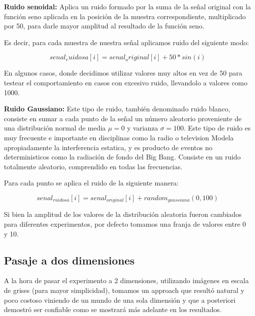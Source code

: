 \begin{itemize}
	\begin{item} {\bf Ruido senoidal:} Aplica un ruido formado por la suma de la se\~nal
original con la funci\'on seno aplicada en la posici\'on de la muestra
correspondiente, multiplicado por 50, para darle mayor amplitud al resultado de
la funci\'on seno.

	Es decir, para cada muestra de nuestra se\~nal aplicamos ruido del siguiente
modo:

	$$senal_ruidosa[i] = senal_original[i] + 50 * sin(i)$$

  En algunos casos, donde decidimos utilizar valores muy altos en vez de 50
para testear el comportamiento en casos con excesivo ruido, llevandolo a valores
como 1000.
	\end{item}

	\begin{item}
		{\bf Ruido Gaussiano:} Este tipo de ruido, tambi\'en denominado ruido
blanco, consiste en sumar a cada punto de la se\~nal un n\'umero aleatorio
proveniente de una distribuci\'on normal de media $\mu = 0$ y varianza $\sigma=100$. 
Este tipo de ruido es muy frecuente e importante en disciplinas como la radio o television
Modela apropiadamente la interferencia estatica, y es producto de eventos no deterministicos como 
la radiaci\'on de fondo del Big Bang. Consiste en un ruido totalmente aleatorio, 
comprendido en todas las frecuencias.

 	Para cada punto se aplica el ruido de la siguiente manera:

    $$senal_{ruidosa}[i] = senal_{original}[i] + random_{gaussiana}(0, 100)$$

	Si bien la amplitud de los valores de la distribuci\'on aleatoria fueron
cambiados para diferentes experimentos, por defecto tomamos una franja de
valores entre 0 y 10.

	\end{item}
\end{itemize}

\subsection{Pasaje a dos dimensiones}

A la hora de pasar el experimento a 2 dimensiones, utilizando im\'agenes en
escala de grises (para mayor simplicidad), tomamos un approach que result\'o
natural y poco costoso viniendo de un mundo de una sola dimensi\'on y que a
posteriori demostr\'o ser confiable como se mostrar\'a m\'as adelante en los
resultados.

